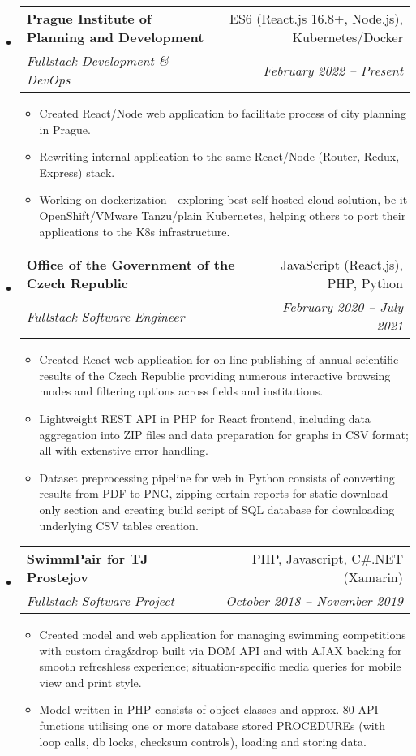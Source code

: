 \documentclass[letterpaper,11pt]{article}
\makeatletter
\newcommand{\sitem}[1]{\item #1 \vspace{-2pt}}
\newcommand{\resumeSubheading}[4]{
  \vspace{-1pt}\item
    \begin{tabular*}{0.97\textwidth}[t]{l@{\extracolsep{\fill}}r}
      \textbf{#1} & #2 \\
      \textit{\small#3} & \textit{\small #4} \\
    \end{tabular*}\vspace{-5pt}
}
\newenvironment{subheadingListing}{\begin{itemize}[leftmargin=*]}{\end{itemize}}
\newenvironment{resumeList}{\begin{itemize}}{\end{itemize}\vspace{-5pt}}
\makeatother
\begin{document}
\begin{subheadingListing}

  \resumeSubheading
  {Prague Institute of Planning and Development}{ES6 (React.js 16.8+, Node.js), Kubernetes/Docker}
  {Fullstack Development \& DevOps}{February 2022 – Present}
  \begin{resumeList}
    \sitem{Created React/Node web application to facilitate process of city planning in Prague.}
    \sitem{Rewriting internal application to the same React/Node (Router, Redux, Express) stack.}
    \sitem{Working on dockerization - exploring best self-hosted cloud solution, be it OpenShift/VMware Tanzu/plain Kubernetes, helping others to port their applications to the K8s infrastructure.}
  \end{resumeList}

  \resumeSubheading
  {Office of the Government of the Czech Republic}{JavaScript (React.js), PHP, Python}
  {Fullstack Software Engineer}{February 2020 – July 2021}
  \begin{resumeList}
    \sitem{Created React web application for on-line publishing of annual scientific results of the Czech Republic providing numerous interactive browsing modes and filtering options across fields and institutions.}
    \sitem{Lightweight REST API in PHP for React frontend, including data aggregation into ZIP files and data preparation for graphs in CSV format; all with extenstive error handling.}
    \sitem{Dataset preprocessing pipeline for web in Python consists of converting results from PDF to PNG, zipping certain reports for static download-only section and creating build script of SQL database for downloading underlying CSV tables creation.}
  \end{resumeList}

  \resumeSubheading
  {SwimmPair for TJ Prostejov}{PHP, Javascript, C\#.NET (Xamarin)}
  {Fullstack Software Project}{October 2018 – November 2019}
  \begin{resumeList}
    \sitem{Created model and web application for managing swimming competitions with custom drag\&drop built via DOM API and with AJAX backing for smooth refreshless experience; situation-specific media queries for mobile view and print style.}
    \sitem{Model written in PHP consists of object classes and approx. 80 API functions utilising one or more database stored PROCEDUREs (with loop calls, db locks, checksum controls), loading and storing data.}
  \end{resumeList}


\end{subheadingListing}
\end{document}
